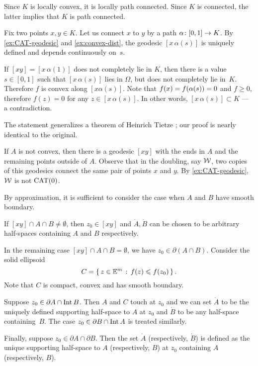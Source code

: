 Since $K$ is locally convex,
it is locally path connected.
Since $K$ is connected, the latter implies that $K$ is path connected.

Fix two points $x,y\in K$. 
Let us connect $x$ to $y$ by a path $\alpha\:[0,1]\z\to K$.
By \ref{ex:CAT-geodesic} and \ref{ex:convex-dist}, the geodesic $[x\,\alpha(s)]$ 
is uniquely defined and depends continuously on~$s$.

If $[xy]=[x\,\alpha(1)]$ does not completely lie in $K$, then 
there is a value $s\in [0,1]$ such that $[x\,\alpha(s)]$ 
lies in $\Omega$,
but does not completely lie in~$K$.
Therefore $f$ is convex 
along $[x\alpha(s)]$.
Note that $f(x)\z=f(\alpha(s))=0$ and $f\ge 0$, 
therefore $f(z)= 0$ for any $z\in [x\,\alpha(s)]$.
In other words, $[x\,\alpha(s)]\subset K$ --- a contradiction.

The statement generalizes a theorem of Heinrich Tietze \cite{tietze}; our proof is nearly identical to the original.

If $A$ is not convex, then there is a geodesic $[xy]$ with the ends in $A$ and the remaining points outside of $A$.
Observe that in the doubling, say $\mathcal{W}$, two copies of this geodesics connect the same pair of points $x$ and $y$.
By \ref{ex:CAT-geodesic}, $\mathcal{W}$ is not $\mathrm{CAT}(0)$.

By approximation, it is sufficient to consider the case when 
$A$ and $B$ have smooth boundary. 

If $[xy]\cap A\cap B\ne \emptyset$, then $z_0\in [xy]$ and $\dot A, \dot B$ can be chosen to be arbitrary half-spaces containing $A$ and $B$ respectively.  

In the remaining case $[xy]\cap A\cap B=\emptyset$, 
we have $z_0\in\partial (A\cap B)$.  
Consider the solid ellipsoid
\[C=\left\{\,{z\in\mathbb{E}^m}\,:\,{f(z)\leqslant f(z_0)}\,\right\}.\] 
Note that $C$ is compact, convex and has  smooth boundary. 

Suppose $z_0\in\partial  A \cap \operatorname{\rm Int}\nolimits B$. 
Then $A$ and $C$ touch at $z_0$ and we can set $\dot A$ to be the uniquely defined supporting half-space to $A$  at $z_0$ and $\dot B$ to be any half-space containing~$B$. 
The case $z_0\in\partial B \cap \operatorname{\rm Int}\nolimits A$ is treated similarly.


Finally, suppose $z_0\in\partial A\cap\partial B$. 
Then the set  $\dot A$ (respectively, $\dot B$) is defined as the unique supporting half-space to $A$ (respectively, $B$) at $z_0$ containing $A$ (respectively, $B$).

